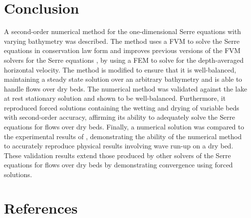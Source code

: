 \documentclass[times]{elsarticle}
\begin{document}
\section{Conclusion}
A second-order numerical method for the one-dimensional Serre equations with varying bathymetry was described. The method uses a FVM to solve the Serre equations in conservation law form and improves previous versions of the FVM solvers for the Serre equations \cite{Zoppou-etal-2017}, by using a FEM to solve for the depth-averaged horizontal velocity. The method is modified to ensure that it is well-balanced, maintaining a steady state solution over an arbitrary bathymetry and is able to handle flows over dry beds. The numerical method was validated against the lake at rest stationary solution and shown to be well-balanced. Furthermore, it reproduced forced solutions containing the wetting and drying of variable beds with second-order accuracy, affirming its ability to adequately solve the Serre equations for flows over dry beds. Finally, a numerical solution was compared to the experimental results of \citet{Synolakis-1987-523}, demonstrating the ability of the numerical method to accurately reproduce physical results involving wave run-up on a dry bed. These validation results extend those produced by other solvers of the Serre equations for flows over dry beds
\cite{Tissier-2011,Li-2014-169,Filippini-etal-2016-381,DoCarmo-2019-125} by demonstrating convergence using forced solutions.


\section*{References}


%
\end{document}
